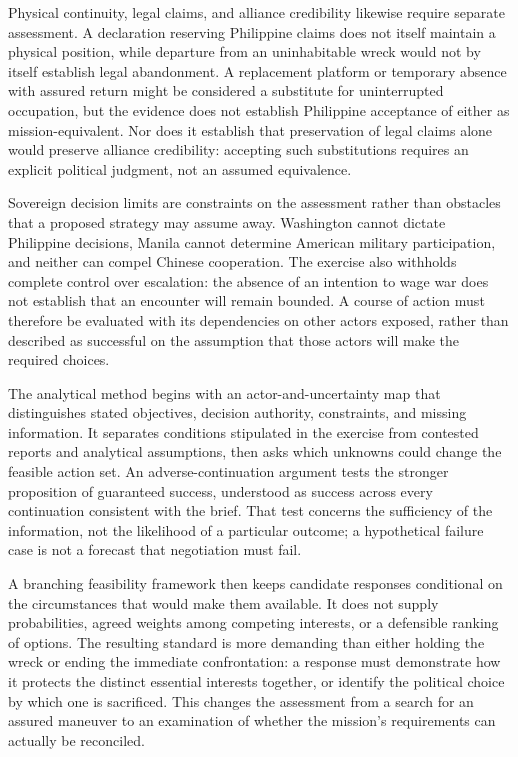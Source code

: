 \documentclass[11pt]{article}
\begin{document}
Physical continuity, legal claims, and alliance credibility likewise require separate assessment. A declaration reserving Philippine claims does not itself maintain a physical position, while departure from an uninhabitable wreck would not by itself establish legal abandonment. A replacement platform or temporary absence with assured return might be considered a substitute for uninterrupted occupation, but the evidence does not establish Philippine acceptance of either as mission-equivalent. Nor does it establish that preservation of legal claims alone would preserve alliance credibility: accepting such substitutions requires an explicit political judgment, not an assumed equivalence.

Sovereign decision limits are constraints on the assessment rather than obstacles that a proposed strategy may assume away. Washington cannot dictate Philippine decisions, Manila cannot determine American military participation, and neither can compel Chinese cooperation. The exercise also withholds complete control over escalation: the absence of an intention to wage war does not establish that an encounter will remain bounded. A course of action must therefore be evaluated with its dependencies on other actors exposed, rather than described as successful on the assumption that those actors will make the required choices.

The analytical method begins with an actor-and-uncertainty map that distinguishes stated objectives, decision authority, constraints, and missing information. It separates conditions stipulated in the exercise from contested reports and analytical assumptions, then asks which unknowns could change the feasible action set. An adverse-continuation argument tests the stronger proposition of guaranteed success, understood as success across every continuation consistent with the brief. That test concerns the sufficiency of the information, not the likelihood of a particular outcome; a hypothetical failure case is not a forecast that negotiation must fail.

A branching feasibility framework then keeps candidate responses conditional on the circumstances that would make them available. It does not supply probabilities, agreed weights among competing interests, or a defensible ranking of options. The resulting standard is more demanding than either holding the wreck or ending the immediate confrontation: a response must demonstrate how it protects the distinct essential interests together, or identify the political choice by which one is sacrificed. This changes the assessment from a search for an assured maneuver to an examination of whether the mission\textquoteright{}s requirements can actually be reconciled.
\end{document}
